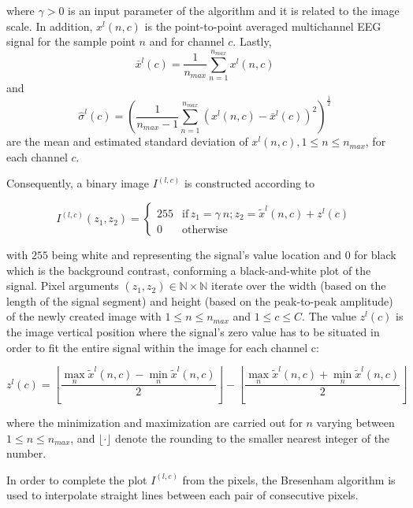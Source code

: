 \documentclass[utf8]{frontiersSCNS} %
\begin{document}
\noindent where $\gamma > 0$ is an input parameter of the algorithm and  it is related to the image scale. In addition, $ x^l(n,c) $ is the point-to-point averaged multichannel EEG signal for the sample point $n$ and for channel $c$. Lastly, $$\bar{x}^l(c) =\frac{1}{n_{max}}\sum_{n=1}^{n_{max}}x^l(n,c)$$ and $$ \hat{\sigma}^l(c) = (\frac{1}{n_{max}-1}\sum_{n=1}^{n_{max}}(x^l(n,c)-\bar{x}^l(c))^2 )^{\frac{1}{2}}$$ are the mean and estimated standard deviation of $x^l(n,c), 1 \leq n \leq n_{max}$, for each channel $c$.

Consequently, a binary image $I^{(l,c)}$ is constructed according to

\begin{equation}
I^{(l,c)}(z_1,z_2) = \left\{ \begin{array}{rl}
255 & \text{if} \,  z_1 = \gamma \  n; \! z_2 = \tilde{x}^l(n,c) + z^l(c) \\
0   & \mbox{otherwise}
\end{array}\right.
\label{eq:images}
\end{equation}

\noindent with $255$ being white and representing the signal's value location and $0$ for black which is the background contrast, conforming a black-and-white plot of the signal.  Pixel arguments $ (z_1,z_2) \in \mathbb{N} \times \mathbb{N}$ iterate over the width (based on the length of the signal segment) and height (based on the peak-to-peak amplitude) of the newly created image with $1 \leq n \leq n_{max}$ and $1 \leq c \leq C$.  The value $z^l(c)$ is the image vertical position where the signal's zero value has to be situated in order to fit the entire signal within the image for each channel c:

\begin{equation}
z^l(c) = \left \lfloor{ \frac{\max_{n} \tilde{x}^l(n,c)  - \min_{n} \tilde{x}^l(n,c) }{2} }\right \rfloor -   \left \lfloor{ \frac{\max_{n} \tilde{x}^l(n,c)  + \min_{n} \tilde{x}^l(n,c)}{ 2} }\right \rfloor
\label{eq:zerolevel}
\end{equation}

\noindent where the minimization and maximization are carried out for $n$ varying between ${1 \leq n\leq n_{max}}$, and $ \lfloor \cdot  \rfloor $ denote the rounding to the smaller nearest integer of the number.
  
In order to complete the plot $I^{(l,c)}$ from the pixels, the Bresenham \citep{Bresenham1965,Ramele2016} algorithm is used to interpolate straight lines between each pair of  consecutive pixels.
\end{document}
